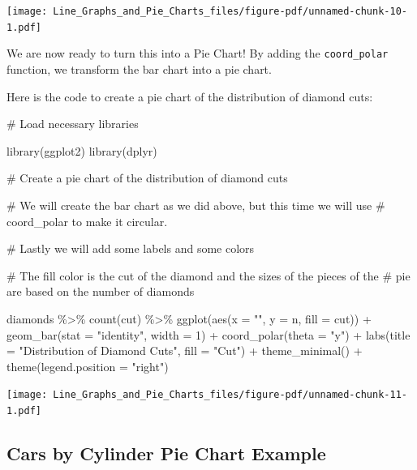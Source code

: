 \documentclass[
  letterpaper,
  DIV=11,
  numbers=noendperiod]{scrreprt}
\newenvironment{Shaded}{\begin{snugshade}}{\end{snugshade}}
\newcommand{\AttributeTok}[1]{\textcolor[rgb]{0.40,0.45,0.13}{#1}}
\newcommand{\CommentTok}[1]{\textcolor[rgb]{0.37,0.37,0.37}{#1}}
\newcommand{\DecValTok}[1]{\textcolor[rgb]{0.68,0.00,0.00}{#1}}
\newcommand{\FunctionTok}[1]{\textcolor[rgb]{0.28,0.35,0.67}{#1}}
\newcommand{\NormalTok}[1]{\textcolor[rgb]{0.00,0.23,0.31}{#1}}
\newcommand{\SpecialCharTok}[1]{\textcolor[rgb]{0.37,0.37,0.37}{#1}}
\newcommand{\StringTok}[1]{\textcolor[rgb]{0.13,0.47,0.30}{#1}}
\begin{document}
\texttt{[image: Line\_Graphs\_and\_Pie\_Charts\_files/figure-pdf/unnamed-chunk-10-1.pdf]}

We are now ready to turn this into a Pie Chart! By adding the
\texttt{coord\_polar} function, we transform the bar chart into a pie
chart.

Here is the code to create a pie chart of the distribution of diamond
cuts:

\begin{Shaded}
\begin{Highlighting}[]
\CommentTok{\# Load necessary libraries}

\FunctionTok{library}\NormalTok{(ggplot2)}
\FunctionTok{library}\NormalTok{(dplyr)}

\CommentTok{\# Create a pie chart of the distribution of diamond cuts}

\CommentTok{\# We will create the bar chart as we did above, but this time we will use}
\CommentTok{\# coord\_polar to make it circular.}

\CommentTok{\# Lastly we will add some labels and some colors}

\CommentTok{\# The fill color is the cut of the diamond and the sizes of the pieces of the }
\CommentTok{\# pie are based on the number of diamonds}

\NormalTok{diamonds }\SpecialCharTok{\%\textgreater{}\%}
  \FunctionTok{count}\NormalTok{(cut) }\SpecialCharTok{\%\textgreater{}\%}
  \FunctionTok{ggplot}\NormalTok{(}\FunctionTok{aes}\NormalTok{(}\AttributeTok{x =} \StringTok{""}\NormalTok{, }\AttributeTok{y =}\NormalTok{ n, }\AttributeTok{fill =}\NormalTok{ cut)) }\SpecialCharTok{+}
  \FunctionTok{geom\_bar}\NormalTok{(}\AttributeTok{stat =} \StringTok{"identity"}\NormalTok{, }\AttributeTok{width =} \DecValTok{1}\NormalTok{) }\SpecialCharTok{+}
  \FunctionTok{coord\_polar}\NormalTok{(}\AttributeTok{theta =} \StringTok{"y"}\NormalTok{) }\SpecialCharTok{+}
  \FunctionTok{labs}\NormalTok{(}\AttributeTok{title =} \StringTok{"Distribution of Diamond Cuts"}\NormalTok{,}
       \AttributeTok{fill =} \StringTok{"Cut"}\NormalTok{) }\SpecialCharTok{+}
  \FunctionTok{theme\_minimal}\NormalTok{() }\SpecialCharTok{+}
  \FunctionTok{theme}\NormalTok{(}\AttributeTok{legend.position =} \StringTok{"right"}\NormalTok{)}
\end{Highlighting}
\end{Shaded}

\texttt{[image: Line\_Graphs\_and\_Pie\_Charts\_files/figure-pdf/unnamed-chunk-11-1.pdf]}

\subsection*{Cars by Cylinder Pie Chart
Example}\label{cars-by-cylinder-pie-chart-example}
\end{document}
